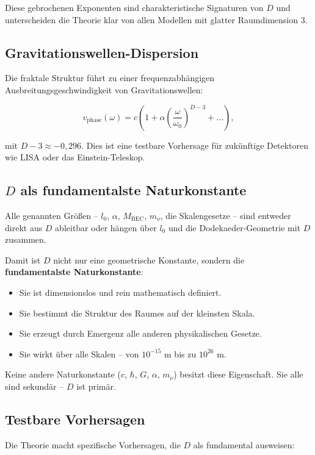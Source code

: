 \documentclass[11pt,a4paper]{article}
\begin{document}
Diese gebrochenen Exponenten sind charakteristische Signaturen von \(D\) und unterscheiden die Theorie klar von allen Modellen mit glatter Raumdimension 3.

\subsection{Gravitationswellen-Dispersion}

Die fraktale Struktur führt zu einer frequenzabhängigen Ausbreitungsgeschwindigkeit von Gravitationswellen:

\[
v_{\text{phase}}(\omega) = c \left( 1 + \alpha \left( \frac{\omega}{\omega_0} \right)^{D-3} + \dots \right),
\]

mit \(D-3 \approx -0,296\). Dies ist eine testbare Vorhersage für zukünftige Detektoren wie LISA oder das Einstein-Teleskop.

\subsection{\(D\) als fundamentalste Naturkonstante}

Alle genannten Größen – \(l_0\), \(\alpha\), \(M_{\text{BEC}}\), \(m_\nu\), die Skalengesetze – sind entweder direkt aus \(D\) ableitbar oder hängen über \(l_0\) und die Dodekaeder-Geometrie mit \(D\) zusammen.

Damit ist \(D\) nicht nur eine geometrische Konstante, sondern die \textbf{fundamentalste Naturkonstante}:

\begin{itemize}
    \item Sie ist dimensionslos und rein mathematisch definiert.
    \item Sie bestimmt die Struktur des Raumes auf der kleinsten Skala.
    \item Sie erzeugt durch Emergenz alle anderen physikalischen Gesetze.
    \item Sie wirkt über alle Skalen – von \(10^{-15}\) m bis zu \(10^{26}\) m.
\end{itemize}

Keine andere Naturkonstante (\(c\), \(\hbar\), \(G\), \(\alpha\), \(m_\nu\)) besitzt diese Eigenschaft. Sie alle sind sekundär – \(D\) ist primär.

\subsection{Testbare Vorhersagen}

Die Theorie macht spezifische Vorhersagen, die \(D\) als fundamental ausweisen:
\end{document}
